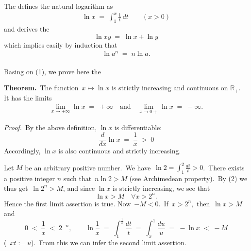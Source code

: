 \documentclass[12pt]{article}
\theoremstyle{definition}
\begin{document}
The  defines the natural logarithm as
\begin{align}
\ln{x} \;=\; \int_1^x\frac{1}{t}\,dt \qquad (x > 0)
\end{align}
and derives the 
$$\ln{xy} \;=\; \ln{x}+\ln{y}$$
which implies easily by induction that
\begin{align}
\ln{a}^n \;=\; n\ln{a}.
\end{align}\\

Basing on (1), we prove here the

\textbf{Theorem.}\, The function \,$x \mapsto \ln{x}$ is strictly increasing and continuous on $\mathbb{R}_+$.\, It has the limits
\begin{align}
\lim_{x\to+\infty}\ln{x} \;=\; +\infty \quad\mbox{and}\quad \lim_{x\to 0+}\ln{x} \;=\; -\infty.
\end{align}


\emph{Proof.}\, By the above definition, $\ln{x}$ is differentiable:
$$\frac{d}{dx}\ln{x} \;=\; \frac{1}{x} \;>\; 0$$
Accordingly, $\ln{x}$ is also continuous and strictly increasing.

Let $M$ be an arbitrary positive number.\, We have\, $\ln2 = \int_1^2\frac{dt}{t} > 0$.\, There exists a positive integer $n$ such that\, $n\ln2 > M$ (see Archimedean property).\, By (2) we thus get\, $\ln{2^n} > M$, and since 
$\ln{x}$ is strictly increasing, we see that
$$\ln{x} > M \quad \forall x > 2^n.$$
Hence the first limit assertion is true.
Now\, $-M < 0$.\, If\, $x > 2^n$,\, then\, $\ln{x} > M$\, and
$$0 \;<\; \frac{1}{x} \;<\; 2^{-n}, \qquad 
\ln\frac{1}{x} \;=\; \int_1^{\frac{1}{x}}\frac{dt}{t} \;=\; \int_x^1\frac{du}{u} \;=\; -\ln{x} \;<\; -M$$
(\, $xt := u$).\, From this we can infer the second limit assertion.







\end{document}
